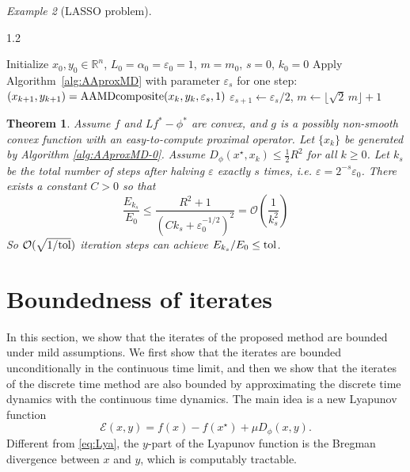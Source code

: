 \documentclass{article}
\newcommand{\LC}[1]{\textcolor{red}{#1}}
\theoremstyle{plain}
\newtheorem{theorem}{Theorem}[section]
\newtheorem{corollary}[theorem]{Corollary}
\theoremstyle{definition}
\theoremstyle{remark}
\newtheorem{example}[theorem]{Example}
\begin{document}
\begin{example}[LASSO problem]
\begin{algorithm}[t]
\caption{AAproxMD-0}\label{alg:AAproxMD-0}
\begin{spacing}{1.2} %
\begin{algorithmic}[1]
\STATE Initialize $x_0,y_0\in\mathbb{R}^n$, $L_0=\alpha_0=\varepsilon_0=1$, $m=m_0$, $s=0$, $k_0=0$ %
  \STATE Apply Algorithm~\ref{alg:AAproxMD} with parameter $\varepsilon_s$ for one step:
 $(x_{k+1}, y_{k+1}) = {\rm AAMDcomposite}(x_k, y_k, \varepsilon_s, 1)$
    \STATE $\varepsilon_{s+1}\gets\varepsilon_s/2$, \quad $m\gets\lfloor\sqrt{2}\,m\rfloor+1$
  \ENDIF
\ENDFOR
\end{algorithmic}
\end{spacing}
\end{algorithm}

\begin{theorem}\label{thm:composite-homotopy}
Assume $f$ and $Lf^* - \phi^*$ are convex, and $g$ is a possibly non-smooth convex function with an easy-to-compute proximal operator. Let $\{x_k\}$ be generated by Algorithm \ref{alg:AAproxMD-0}. Assume $D_\phi(x^\star, x_k) \le \tfrac12 R^2$ for all $k\geq 0$. Let  $k_s$ be the total number of steps after halving $\varepsilon$ exactly $s$ times, i.e. $\varepsilon = 2^{-s}\varepsilon_0$. There exists a constant $C > 0$ so that
$$
\frac{E_{k_s}}{E_0} \leq \frac{R^2 + 1}{\left( C k_s + \varepsilon_0^{-1/2} \right)^2} = \mathcal{O}\left( \frac{1}{k_s^2} \right)
$$
So $\mathcal O(\sqrt{1/{\rm tol}})$  iteration steps can achieve $E_{k_s}/E_0\leq {\rm tol}$. 
\end{theorem}


\end{example}
\section{Boundedness of iterates}
\label{sec:boundedness}
In this section, we show that the iterates of the proposed method are bounded under mild assumptions. We first show that the iterates are bounded unconditionally in the continuous time limit, and then we show that the iterates of the discrete time method are also bounded by approximating the discrete time dynamics with the continuous time dynamics. The main idea is a new Lyapunov function
\begin{equation}\label{eq:lyapunov_appendix}
\mathcal{E}(x,y)=f(x)-f(x^\star)+\mu D_\phi(x,y).
\end{equation}
Different from \eqref{eq:Lya}, the $y$-part of the Lyapunov function is the Bregman divergence between $x$ and $y$, which is computably tractable.
\end{document}
